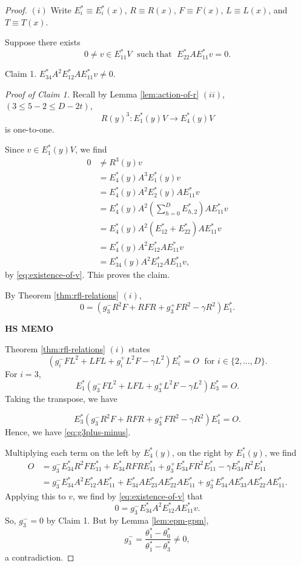 \documentclass[
]{book}
\theoremstyle{definition}
\theoremstyle{definition}
\theoremstyle{definition}
\theoremstyle{definition}
\theoremstyle{remark}
\begin{document}
\begin{proof}
\leavevmode

\((i)\) Write \(E^*_i\equiv E^*_i(x)\), \(R \equiv R(x)\), \(F \equiv F(x)\), \(L \equiv L(x)\), and \(T \equiv T(x)\).

Suppose there exists
\begin{equation}
0\neq v\in E^*_{11}V \; \text{ such that }\; E^*_{22}AE^*_{11}v = 0. \label{eq:existence-of-v}
\end{equation}

Claim 1. \(E^*_{34}A^2E^*_{12}AE^*_{11}v \neq 0\).

\emph{Proof of Claim 1.}
Recall by Lemma \ref{lem:action-of-r} \((ii)\), \((3 \leq 5-2 \leq D-2t)\),
\[R(y)^3: E^*_1(y)V \to E^*_4(y)V\]
is one-to-one.

Since \(v\in E^*_1(y)V\), we find
\begin{align}
0 & \neq R^3(y)v\\
& = E^*_4(y)A^3E^*_1(y)v\\
& = E^*_4(y)A^2E^*_2(y)AE^*_{11}v\\
& = E^*_4(y)A^2\left(\sum_{h=0}^D E^*_{h,2}\right)AE^*_{11}v\\
& = E^*_4(y)A^2(E^*_{12} + E^*_{22})AE^*_{11}v\\
& = E^*_4(y)A^2E^*_{12}AE^*_{11}v \\
& = E^*_{34}(y)A^2E^*_{12}AE^*_{11}v,
\end{align}
by \eqref{eq:existence-of-v}.
This proves the claim.

By Theorem \ref{thm:rfl-relations} \((i)\),
\begin{equation}
0 = (g_3^-R^2F + RFR + g^+_3FR^2 - \gamma R^2)E^*_1.  \label{eq:g3plus-minus}
\end{equation}

\textbf{HS MEMO}

Theorem \ref{thm:rfl-relations} \((i)\) states
\[(g_i^-FL^2 + LFL + g^+_iL^2F - \gamma L^2)E^*_i = O \;\text{ for }i\in \{2, \ldots, D\}.\]
For \(i = 3\),
\[E^*_1(g^-_3 FL^2 + LFL + g^+_3 L^2F - \gamma L^2)E^*_3 = O.\]
Taking the transpose, we have

\[E^*_3(g^{-}_3 R^2 F + RFR + g^{+}_3 FR^2 - \gamma R^2) E^*_1 = O.\]
Hence, we have \eqref{eq:g3plus-minus}.

Multiplying each term on the left by \(E^*_4(y)\), on the right by \(E^*_1(y)\), we find
\begin{align}
O & = g^-_3E^*_{34}R^2FE^*_{11} + E^*_{34}RFRE^*_{11} + g^+_3E^*_{34}FR^2E^*_{11}-\gamma E^*_{34}R^2E^*_{11}\\
& = g^-_3E^*_{34}A^2E^*_{12}AE^*_{11} + E^*_{34}AE^*_{23}AE^*_{22}AE^*_{11} + g^+_3E^*_{34}AE^*_{33}AE^*_{22}AE^*_{11}. \label{eq:g3plus-minus-zero}
\end{align}
Applying this to \(v\), we find by \eqref{eq:existence-of-v} that
\[0 = g^-_3E^*_{34}A^2E^*_{12}AE^*_{11}v.\]
So, \(g^-_3 = 0\) by Claim 1. But by Lemma \ref{lem:epm-gpm},
\[g^-_3 = \frac{\theta^*_1-\theta^*_0}{\theta^*_1-\theta^*_3} \neq 0,\]
a contradiction.

\end{proof}
\end{document}
